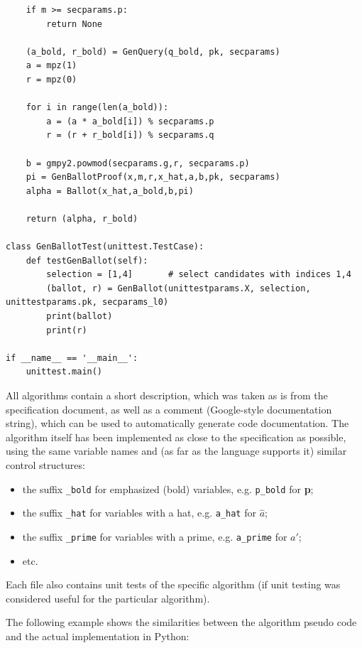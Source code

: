 \begin{verbatim}
    if m >= secparams.p:
        return None

    (a_bold, r_bold) = GenQuery(q_bold, pk, secparams)
    a = mpz(1)
    r = mpz(0)

    for i in range(len(a_bold)):
        a = (a * a_bold[i]) % secparams.p
        r = (r + r_bold[i]) % secparams.q

    b = gmpy2.powmod(secparams.g,r, secparams.p)
    pi = GenBallotProof(x,m,r,x_hat,a,b,pk, secparams)
    alpha = Ballot(x_hat,a_bold,b,pi)

    return (alpha, r_bold)

class GenBallotTest(unittest.TestCase):
    def testGenBallot(self):
        selection = [1,4]       # select candidates with indices 1,4
        (ballot, r) = GenBallot(unittestparams.X, selection, unittestparams.pk, secparams_l0)
        print(ballot)
        print(r)

if __name__ == '__main__':
    unittest.main()
\end{verbatim}

All algorithms contain a short description, which was taken as is from the specification document, as well as a comment (Google-style documentation string), which can be used to automatically generate code documentation. The algorithm itself has been implemented as close to the specification as possible, using the same variable names and (as far as the language supports it) similar control structures:

\begin{itemize}
	\item the suffix \texttt{\_bold} for emphasized (bold) variables, e.g. \texttt{p\_bold} for \textbf{p};
	\item the suffix \texttt{\_hat} for variables with a hat, e.g. \texttt{a\_hat} for $\hat{a}$;
	\item the suffix \texttt{\_prime} for variables with a prime, e.g. \texttt{a\_prime} for $a'$;
	\item etc.
\end{itemize}

Each file also contains unit tests of the specific algorithm (if unit testing was considered useful for the particular algorithm).

The following example shows the similarities between the algorithm pseudo code and the actual implementation in Python:

